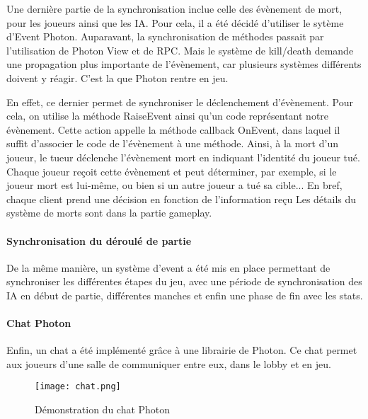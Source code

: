            Une dernière partie de la synchronisation inclue celle des évènement de mort, pour les joueurs ainsi
            que les IA. Pour cela, il a été décidé d'utiliser le sytème d'Event Photon. Auparavant, la synchronisation de méthodes
            passait par l'utilisation de Photon View et de RPC. Mais le système de kill/death demande une propagation plus importante
            de l'évènement, car plusieurs systèmes différents doivent y réagir. C'est la que Photon rentre en jeu.

            En effet, ce dernier permet de synchroniser le déclenchement d'évènement. Pour cela, on utilise la méthode RaiseEvent ainsi
            qu'un code représentant notre évènement. Cette action appelle la méthode callback OnEvent, dans laquel il suffit d'associer le
            code de l'évènement à une méthode. Ainsi, à la mort d'un joueur, le tueur déclenche l'évènement mort en indiquant l'identité du
            joueur tué. Chaque joueur reçoit cette évènement et peut déterminer, par exemple, si le joueur mort est lui-même, ou bien si un
            autre joueur a tué sa cible... En bref, chaque client prend une décision en fonction de l'information reçu
            Les détails du système de morts sont dans la partie gameplay.

        \paragraph{Synchronisation du déroulé de partie}
            De la même manière, un système d'event a été mis en place permettant de synchroniser les différentes étapes du jeu, 
            avec une période de synchronisation des IA en début de partie, différentes manches et enfin une phase de fin avec les stats.

        \paragraph{Chat Photon}
        Enfin, un chat a été implémenté grâce à une librairie de Photon. Ce chat permet aux joueurs 
        d'une salle de communiquer entre eux, dans le lobby et en jeu.

        \begin{figure}[hbt!]
            \centering
            \texttt{[image: chat.png]}
            \caption{Démonstration du chat Photon}
        \end{figure}


